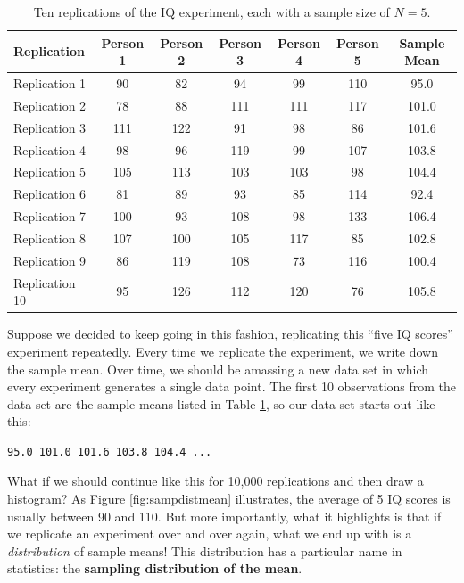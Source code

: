 \documentclass[
]{book}
\theoremstyle{definition}
\theoremstyle{definition}
\theoremstyle{definition}
\theoremstyle{definition}
\theoremstyle{remark}
\begin{document}
\begin{table}

\caption{\label{tab:replications}Ten replications of the IQ experiment, each with a sample size of $N=5$.}
\centering
\begin{tabular}[t]{lcccccc}
\toprule
Replication & Person 1 & Person 2 & Person 3 & Person 4 & Person 5 & Sample Mean\\
\midrule
Replication 1 & 90 & 82 & 94 & 99 & 110 & 95.0\\
Replication 2 & 78 & 88 & 111 & 111 & 117 & 101.0\\
Replication 3 & 111 & 122 & 91 & 98 & 86 & 101.6\\
Replication 4 & 98 & 96 & 119 & 99 & 107 & 103.8\\
Replication 5 & 105 & 113 & 103 & 103 & 98 & 104.4\\
\addlinespace
Replication 6 & 81 & 89 & 93 & 85 & 114 & 92.4\\
Replication 7 & 100 & 93 & 108 & 98 & 133 & 106.4\\
Replication 8 & 107 & 100 & 105 & 117 & 85 & 102.8\\
Replication 9 & 86 & 119 & 108 & 73 & 116 & 100.4\\
Replication 10 & 95 & 126 & 112 & 120 & 76 & 105.8\\
\bottomrule
\end{tabular}
\end{table}

Suppose we decided to keep going in this fashion, replicating this ``five IQ scores'' experiment repeatedly. Every time we replicate the experiment, we write down the sample mean. Over time, we should be amassing a new data set in which every experiment generates a single data point. The first 10 observations from the data set are the sample means listed in Table \ref{tab:replications}, so our data set starts out like this:

\begin{verbatim}
95.0 101.0 101.6 103.8 104.4 ...
\end{verbatim}

What if we should continue like this for 10,000 replications and then draw a histogram? As Figure \ref{fig:sampdistmean} illustrates, the average of 5 IQ scores is usually between 90 and 110. But more importantly, what it highlights is that if we replicate an experiment over and over again, what we end up with is a \emph{distribution} of sample means! This distribution has a particular name in statistics: the \textbf{sampling distribution of the mean}.
\end{document}
